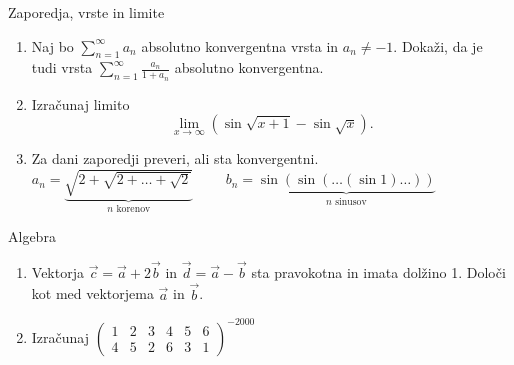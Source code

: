 \begin{frame}{Zaporedja, vrste in limite}
	\begin{enumerate}
		\item 
		Naj bo $\sum_{n=1}^{\infty} a_n$ absolutno konvergentna vrsta in $a_n \ne -1$.
		Dokaži, da je tudi vrsta $\sum_{n=1}^\infty \frac{a_n}{1+a_n}$
		absolutno konvergentna.

		\item
		Izračunaj limito
		$$\lim_{x\to \infty}\left(\sin\sqrt{x+1}-\sin\sqrt{x}\right) .$$

		\item
		Za dani zaporedji preveri, ali sta konvergentni.
		$a_n = \underbrace{\sqrt{2+\sqrt{2+\dots+\sqrt{2}}}}_{n\text{ korenov}} \qquad $
		$b_n = \underbrace{\sin(\sin(\dots(\sin 1)\dots))}_{n\text{ sinusov}} $
	\end{enumerate}
\end{frame}

\begin{frame}{Algebra}
	\begin{enumerate}
		\item
		Vektorja $\vec{c} = \vec{a} + 2\vec{b} $ in $\vec{d} = \vec{a} - \vec{b}$
		sta pravokotna in imata dolžino 1. Določi kot med vektorjema $\vec{a}$ in $\vec{b}$.
		\item 
		Izračunaj
		\( \begin{pmatrix}
			1 & 2 & 3 & 4 & 5 & 6 \\
			4 & 5 & 2 & 6 & 3 & 1
		\end{pmatrix}^{-2000}
		\)
	\end{enumerate}
\end{frame}

